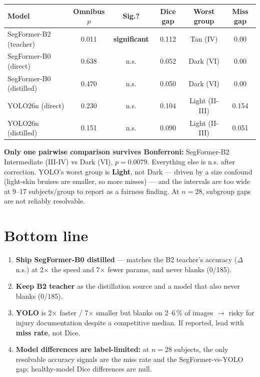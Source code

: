 \documentclass[11pt]{article}
\newcommand{\sig}{\textcolor{red!70!black}{\textbf{significant}}}
\newcommand{\ns}{n.s.}
\begin{document}
\begin{center}
\begin{tabular}{lccccc}
\toprule
Model & Omnibus $p$ & Sig.? & Dice gap & Worst group & Miss gap \\
\midrule
SegFormer-B2 (teacher)   & 0.011 & \sig & 0.112 & Tan (IV)       & 0.00 \\
SegFormer-B0 (direct)    & 0.638 & \ns  & 0.052 & Dark (VI)      & 0.00 \\
SegFormer-B0 (distilled) & 0.470 & \ns  & 0.050 & Dark (VI)      & 0.00 \\
YOLO26n (direct)         & 0.230 & \ns  & 0.104 & Light (II-III) & 0.154 \\
YOLO26n (distilled)      & 0.151 & \ns  & 0.090 & Light (II-III) & 0.051 \\
\bottomrule
\end{tabular}
\end{center}

\textbf{Only one pairwise comparison survives Bonferroni:} SegFormer-B2
Intermediate (III-IV) vs Dark (VI), $p{=}0.0079$. Everything else is \ns{}
after correction. YOLO's worst group is \textbf{Light}, not Dark --- driven by
a size confound (light-skin bruises are smaller, so more misses) --- and the
intervals are too wide at 9--17 subjects/group to report as a fairness finding.
At $n{=}28$, subgroup gaps are not reliably resolvable.

\section*{Bottom line}
\begin{enumerate}[leftmargin=1.4em]
\item \textbf{Ship SegFormer-B0 distilled} --- matches the B2 teacher's
  accuracy ($\Delta$ \ns) at 2$\times$ the speed and 7$\times$ fewer params,
  and never blanks (0/185).
\item \textbf{Keep B2 teacher} as the distillation source and a model that also
  never blanks (0/185).
\item \textbf{YOLO} is 2$\times$ faster / 7$\times$ smaller but blanks on
  2--6\,\% of images $\to$ risky for injury documentation despite a competitive
  median. If reported, lead with \textbf{miss rate}, not Dice.
\item \textbf{Model differences are label-limited:} at $n{=}28$ subjects, the
  only resolvable accuracy signals are the miss rate and the SegFormer-vs-YOLO
  gap; healthy-model Dice differences are null.
\end{enumerate}
\end{document}
